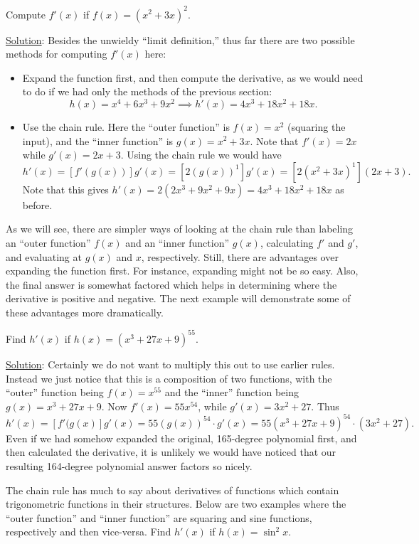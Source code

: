 \bex Compute $f'(x)$ if $f(x)=(x^2+3x)^2$.

\underline{Solution}:
Besides the unwieldy ``limit definition,'' thus far there 
are two possible methods for computing $f'(x)$ here:
\begin{itemize}
\item Expand the function first, and then compute the derivative, as
we would need to do if we had only the methods of the previous section:
$$h(x)=x^4+6x^3+9x^2\implies h'(x)=4x^3+18x^2+18x.$$
\item Use the chain rule.  Here the ``outer function'' is 
      $f(x)=x^2$ (squaring the input), 
      and the ``inner function'' is $g(x)=x^2+3x$.
      Note that $f'(x)=2x$ while $g'(x)=2x+3$.  Using the chain rule
      we would have
      $$h'(x)=[f'(g(x))]g'(x)=\left[2(g(x))^1\right]g'(x)
            =\left[2(x^2+3x)^1\right](2x+3).$$
Note that this gives $h'(x)=2(2x^3+9x^2+9x)=4x^3+18x^2+18x$ as before.
\end{itemize}
\eex
As we will see, there are simpler ways of looking at the chain
rule than labeling an ``outer function'' $f(x)$ and
an  ``inner function'' $g(x)$, calculating $f'$ and $g'$, and
evaluating at $g(x)$ and $x$, respectively.  Still, there are advantages over
expanding the function first.  For instance, expanding might not
be so easy.  Also, the final answer is somewhat factored which
helps in determining where the derivative is positive and negative.
The next example will demonstrate some of these
advantages more dramatically.

\bex Find $h'(x)$ if $h(x) =(x^3+27x+9)^{55}$.

\underline{Solution}: 
Certainly we do not want to multiply this out
to use earlier rules.  Instead we just notice that this
is a composition of two functions, with the
``outer'' function being $f(x)=x^{55}$ and the
``inner'' function being $g(x)=x^3+27x+9$.  
Now $f'(x)=55x^{54}$, while $g'(x)=3x^2+27$.  Thus
$$h'(x)=[f'(g(x)]g'(x)=55(g(x))^{54}\cdot g'(x)
=55(x^3+27x+9)^{54}\cdot(3x^2+27).$$
Even if we had somehow expanded the original, 165-degree polynomial first,
and then calculated the derivative, it is unlikely
we would have noticed that our resulting 164-degree polynomial
answer factors so nicely.\eex

The chain rule has much to say about derivatives of functions which 
contain trigonometric functions in their structures.  
Below are two examples where 
the ``outer function'' and ``inner function'' are
squaring and sine functions, respectively and then vice-versa.
\bex Find $h'(x)$ if $h(x)=\sin^2x.$

